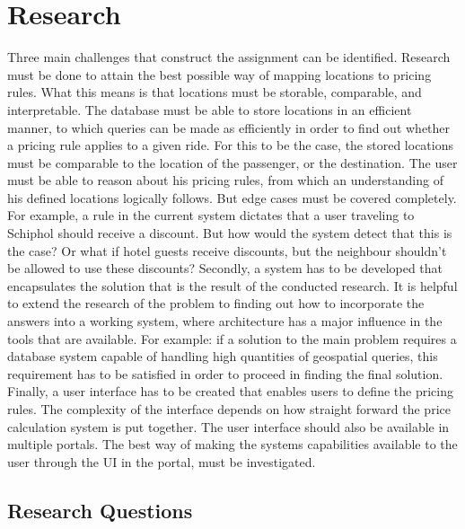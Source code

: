 \section{Research}
Three main challenges that construct the assignment can be identified. Research must be done to attain the best possible way of mapping locations to pricing rules. What this means is that locations must be storable, comparable, and interpretable. The database must be able to store locations in an efficient manner, to which queries can be made as efficiently in order to find out whether a pricing rule applies to a given ride. For this to be the case, the stored locations must be comparable to the location of the passenger, or the destination. The user must be able to reason about his pricing rules, from which an understanding of his defined locations logically follows. But edge cases must be covered completely. For example, a rule in the current system dictates that a user traveling to Schiphol should receive a discount. But how would the system detect that this is the case? Or what if hotel guests receive discounts, but the neighbour shouldn't be allowed to use these discounts? Secondly, a system has to be developed that encapsulates the solution that is the result of the conducted research. It is helpful to extend the research of the problem to finding out how to incorporate the answers into a working system, where architecture has a major influence in the tools that are available. For example: if a solution to the main problem requires a database system capable of handling high quantities of geospatial queries, this requirement has to be satisfied in order to proceed in finding the final solution. Finally, a user interface has to be created that enables users to define the pricing rules. The complexity of the interface depends on how straight forward the price calculation system is put together. The user interface should also be available in multiple portals. The best way of making the systems capabilities available to the user through the UI in the portal, must be investigated.

\subsection{Research Questions}

